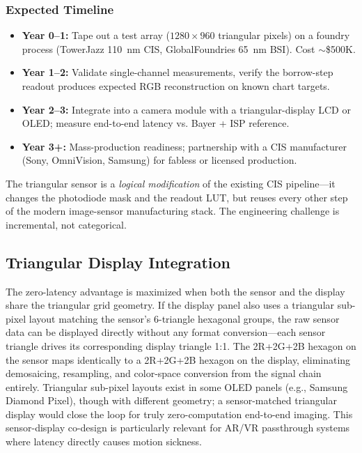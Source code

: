 \documentclass[10pt,twocolumn,letterpaper]{article}
\begin{document}
\subsubsection*{Expected Timeline}
\begin{itemize}[nosep]
\item \textbf{Year 0--1:} Tape out a test array ($1280\times 960$ triangular pixels) on a foundry process (TowerJazz 110~nm CIS, GlobalFoundries 65~nm BSI). Cost $\sim$\$500K.
\item \textbf{Year 1--2:} Validate single-channel measurements, verify the borrow-step readout produces expected RGB reconstruction on known chart targets.
\item \textbf{Year 2--3:} Integrate into a camera module with a triangular-display LCD or OLED; measure end-to-end latency vs. Bayer + ISP reference.
\item \textbf{Year 3+:} Mass-production readiness; partnership with a CIS manufacturer (Sony, OmniVision, Samsung) for fabless or licensed production.
\end{itemize}

The triangular sensor is a \emph{logical modification} of the existing CIS pipeline---it changes the photodiode mask and the readout LUT, but reuses every other step of the modern image-sensor manufacturing stack. The engineering challenge is incremental, not categorical.

\subsection{Triangular Display Integration}\label{sec:display}

The zero-latency advantage is maximized when both the sensor and the display share the triangular grid geometry. If the display panel also uses a triangular sub-pixel layout matching the sensor's 6-triangle hexagonal groups, the raw sensor data can be displayed directly without any format conversion---each sensor triangle drives its corresponding display triangle 1:1. The 2R+2G+2B hexagon on the sensor maps identically to a 2R+2G+2B hexagon on the display, eliminating demosaicing, resampling, and color-space conversion from the signal chain entirely. Triangular sub-pixel layouts exist in some OLED panels (e.g., Samsung Diamond Pixel), though with different geometry; a sensor-matched triangular display would close the loop for truly zero-computation end-to-end imaging. This sensor-display co-design is particularly relevant for AR/VR passthrough systems where latency directly causes motion sickness.
\end{document}
